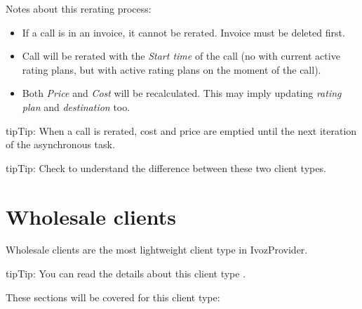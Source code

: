 \documentclass[letterpaper,10pt,english]{sphinxmanual}
\begin{document}
Notes about this rerating process:
\begin{itemize}
\item {} 
If a call is in an invoice, it cannot be rerated. Invoice must be deleted first.

\item {} 
Call will be rerated with the \emph{Start time} of the call (no with current active rating plans, but with active rating plans
on the moment of the call).

\item {} 
Both \emph{Price} and \emph{Cost} will be recalculated. This may imply updating \emph{rating plan} and \emph{destination} too.

\end{itemize}

\begin{notice}{tip}{Tip:}
When a call is rerated, cost and price are emptied until the next iteration of the asynchronous task.
\end{notice}

\begin{notice}{tip}{Tip:}
Check {\hyperref[administration_portal/brand/clients/retail:differences\string-between\string-retail\string-and\string-residential\string-clients]{}} to understand the difference between these two
client types.
\end{notice}
\label{administration_portal/client/wholesale/index:wholesale-clients}

\section{Wholesale clients}
\label{administration_portal/client/wholesale/index:clientes-wholesale}\label{administration_portal/client/wholesale/index:wholesale-clients}\label{administration_portal/client/wholesale/index::doc}\label{administration_portal/client/wholesale/index:id1}
Wholesale clients are the most lightweight client type in IvozProvider.

\begin{notice}{tip}{Tip:}
You can read the details about this client type {\hyperref[administration_portal/brand/clients/wholesale:wholesale\string-clients]{}}.
\end{notice}

These sections will be covered for this client type:
\end{document}
